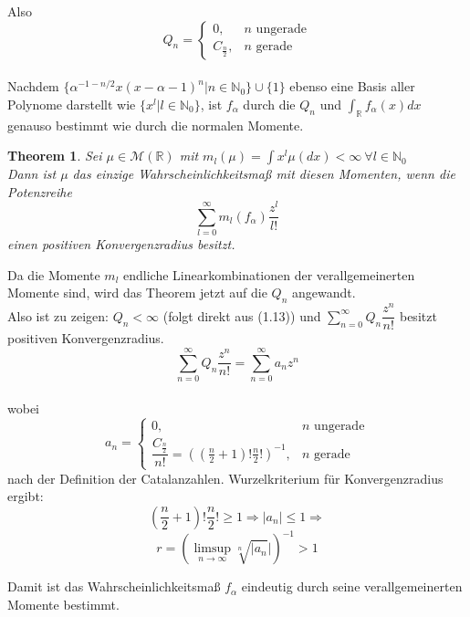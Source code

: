 \documentclass[a4paper, 11pt]{scrreprt}
\newtheorem{theorem}[defi]{Theorem}
\newcommand{\RR}{\mathbb{R}}
\newcommand{\NN}{\mathbb{N}}
\begin{document}
Also \begin{equation}
Q_n=\begin{cases} 0, &n\text{ ungerade}\\
	C_{\frac n 2}, &n\text{ gerade} \end{cases}
\end{equation}\\

Nachdem $\lbrace \alpha^{-1-n/2} x(x-\alpha -1)^n \vert n \in \NN_{0}\rbrace \cup \lbrace 1 \rbrace$ ebenso eine Basis aller Polynome darstellt wie $ \lbrace x^l \vert l \in \NN_{0} \rbrace $, ist $ f_{\alpha} $ durch die $ Q_n $ und $ \int_{\RR} f_{\alpha}(x)dx $ genauso bestimmt wie durch die normalen Momente. 

\begin{theorem}
Sei $ \mu \in \mathcal{M}(\RR) $ mit $ m_l (\mu)=\int x^l \mu(dx) < \infty~ \forall l \in \NN_{0} $\\
Dann ist $ \mu $ das einzige Wahrscheinlichkeitsmaß mit diesen Momenten, wenn die Potenzreihe 
\[\sum_{l=0}^\infty m_l(f_\alpha) \frac{z^l}{l!}\]
einen positiven Konvergenzradius besitzt.
\end{theorem}

Da die Momente $ m_l $ endliche Linearkombinationen der verallgemeinerten Momente sind, wird das Theorem jetzt auf die $ Q_n $ angewandt.\\
Also ist zu zeigen: $ Q_n< \infty $ (folgt direkt aus (1.13)) und $ \sum_{n=0}^{\infty} Q_n \dfrac{z^n}{n!}$ besitzt positiven Konvergenzradius.\\
\[ \sum_{n=0}^{\infty} Q_n \dfrac{z^n}{n!}= \sum_{n=0}^{\infty} a_n z^n\]\\
wobei \[ a_n=\begin{cases} 0, &n\text{ ungerade}\\
	\dfrac{C_{\frac n 2}}{n!}=((\frac{n}{2}+1)!\frac{n}{2}!)^{-1}, &n\text{ gerade} \end{cases} \]
	nach der Definition der Catalanzahlen.
	Wurzelkriterium für Konvergenzradius ergibt: 
	\[(\frac{n}{2}+1)!\frac{n}{2}! \geq 1 \Rightarrow \vert a_n \vert \leq 1 \Rightarrow \]
	\[ r=(\limsup_{n \to \infty} \sqrt[n]{\vert a_n} \vert )^{-1} >1 \]

Damit ist das Wahrscheinlichkeitsmaß $f_\alpha  $ eindeutig durch seine verallgemeinerten Momente bestimmt.
\end{document}

